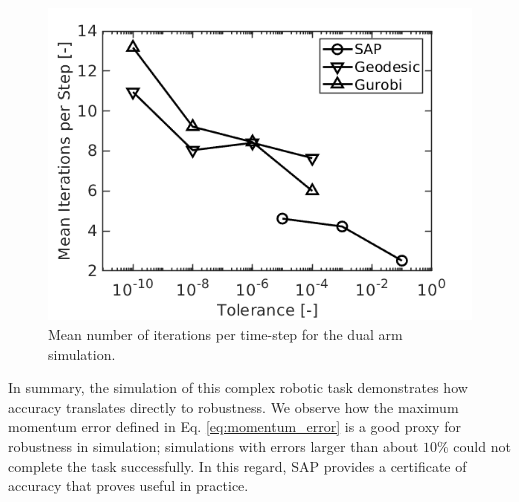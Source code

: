 \begin{figure}[!h]
	\centering
    \includegraphics[width=0.7\columnwidth]{figures/dual_arm/iterations_per_step.png}
    \caption{\label{fig:dual_arm_iterations} Mean number of iterations per
    time-step for the dual arm simulation.}
\end{figure}

In summary, the simulation of this complex robotic task demonstrates how
accuracy translates directly to robustness. We observe how the maximum momentum
error defined in Eq. \eqref{eq:momentum_error} is a good proxy for robustness in
simulation; simulations with errors larger than about $10\%$ could not complete
the task successfully. In this regard, SAP provides a certificate of accuracy
that proves useful in practice.
